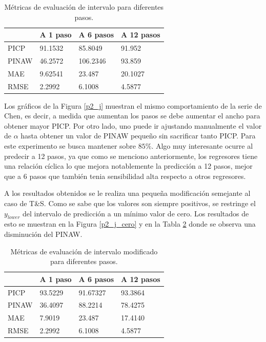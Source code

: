 \documentclass[12pt]{article}
\begin{document}
\begin{table}[h!]
	\centering
	\caption{Métricas de evaluación de intervalo para diferentes pasos.}
	\begin{tabular}{|l|l|l|l|}
		\hline
		& A 1 paso &A 6 pasos & A 12 pasos \\\hline
		PICP     &  91.1532   &  85.8049   & 91.952   \\ \hline
		PINAW    & 46.2572   & 106.2346    & 93.859    \\ \hline
		MAE & 9.62541 & 23.487 &20.1027\\ \hline
		RMSE &2.2992 & 6.1008 & 4.5877\\ \hline
	\end{tabular}
	\label{tab_p2}
\end{table}

Los gráficos de la Figura \ref{p2_j} muestran el mismo comportamiento de la serie de Chen, es decir, a medida que aumentan los pasos se debe aumentar el ancho para obtener mayor PICP. Por otro lado, uno puede ir ajustando manualmente el valor de $\alpha$ hasta obtener un valor de PINAW pequeño sin sacrificar tanto PICP. Para este experimento se busca mantener sobre $85\%$. Algo muy interesante ocurre al predecir a 12 pasos, ya que como se menciono anteriormente, los regresores tiene una relación cíclica lo que mejora notablemente la predicción a 12 pasos, mejor que a 6 pasos que también tenia sensibilidad alta respecto a otros regresores.

A los resultados obtenidos se le realiza una pequeña modificación semejante al caso de T\&S. Como se sabe que los valores son siempre positivos, se restringe el $y_{lower}$ del intervalo de predicción a un mínimo valor de cero. Los resultados de esto se muestran en la Figura \ref{p2_j_cero} y en la Tabla \ref{tab_p2_cero} donde se observa una disminución del PINAW.
\begin{table}[h!]
	\centering
	\caption{Métricas de evaluación de intervalo modificado para diferentes pasos.}
	\begin{tabular}{|l|l|l|l|}
		\hline
		& A 1 paso &A 6 pasos & A 12 pasos \\\hline
		PICP     &  93.5229   &  91.67327   & 93.3864   \\ \hline
		PINAW    & 36.4097   & 88.2214    & 78.4275    \\ \hline
		MAE &7.9019 & 23.487 &17.4140\\ \hline
		RMSE &2.2992 & 6.1008 & 4.5877\\ \hline
	\end{tabular}
	\label{tab_p2_cero}
\end{table}
\end{document}
